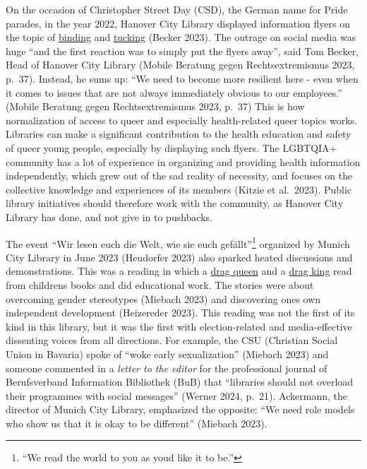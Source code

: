 \documentclass[a4paper,
fontsize=11pt,
oneside,
numbers=noperiodatend,
parskip=half-,
bibliography=totoc,
final
]{scrartcl}
\begin{document}
On the occasion of Christopher Street Day (CSD), the German name for
Pride parades, in the year 2022, Hanover City Library displayed
information flyers on the topic of
\href{https://trans.fandom.com/wiki/Binding}{binding} and
\href{https://trans.fandom.com/wiki/Tucking}{tucking} (Becker 2023). The
outrage on social media was huge \enquote{and the first reaction was to simply
put the flyers away}, said Tom Becker, Head of Hanover City Library
(Mobile Beratung gegen Rechtsextremismus 2023, p.~37). Instead, he sums
up: \enquote{We need to become more resilient here - even when it comes to
issues that are not always immediately obvious to our employees.}
(Mobile Beratung gegen Rechtsextremismus 2023, p.~37) This is how
normalization of access to queer and especially health-related queer
topics works. Libraries can make a significant contribution to the
health education and safety of queer young people, especially by
displaying such flyers. The LGBTQIA+ community has a lot of experience
in organizing and providing health information independently, which grew
out of the sad reality of necessity, and focuses on the collective
knowledge and experiences of its members (Kitzie et al.~2023). Public
library initiatives should therefore work with the community, as Hanover
City Library has done, and not give in to pushbacks.

The event \enquote{Wir lesen euch die Welt, wie sie euch gefällt}\footnote{\enquote{We
  read the world to you as you\textquotesingle d like it to be.}}
organized by Munich City Library in June 2023 (Heudorfer 2023) also
sparked heated discussions and demonstrations. This was a reading in
which a
\href{https://dictionary.cambridge.org/de/worterbuch/englisch/drag-queen}{drag
queen} and a
\href{https://dictionary.cambridge.org/de/worterbuch/englisch/drag-king}{drag
king} read from children\textquotesingle s books and did educational
work. The stories were about overcoming gender stereotypes (Miebach
2023) and discovering one\textquotesingle s own independent development
(Heizereder 2023). This reading was not the first of its kind in this
library, but it was the first with election-related and media-effective
dissenting voices from all directions. For example, the CSU (Christian
Social Union in Bavaria) spoke of \enquote{woke early sexualization} (Miebach
2023) and someone commented in a \emph{letter to the editor} for the
professional journal of Berufsverband Information Bibliothek (BuB) that
\enquote{libraries should not overload their programmes with social messages}
(Werner 2024, p.~21). Ackermann, the director of Munich City Library,
emphasized the opposite: \enquote{We need role models who show us that it is
okay to be different} (Miebach 2023).
\end{document}
